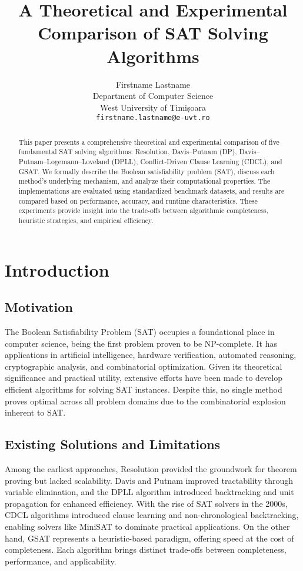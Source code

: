 \documentclass[11pt]{article}
\title{A Theoretical and Experimental Comparison of SAT Solving Algorithms}
\author{Firstname Lastname \\
Department of Computer Science \\
West University of Timișoara \\
\texttt{firstname.lastname@e-uvt.ro}}
\date{}
\begin{document}
\maketitle

\begin{abstract}
This paper presents a comprehensive theoretical and experimental comparison of five fundamental SAT solving algorithms: Resolution, Davis–Putnam (DP), Davis–Putnam–Logemann–Loveland (DPLL), Conflict-Driven Clause Learning (CDCL), and GSAT. We formally describe the Boolean satisfiability problem (SAT), discuss each method's underlying mechanism, and analyze their computational properties. The implementations are evaluated using standardized benchmark datasets, and results are compared based on performance, accuracy, and runtime characteristics. These experiments provide insight into the trade-offs between algorithmic completeness, heuristic strategies, and empirical efficiency.
\end{abstract}

\tableofcontents
\newpage

\section{Introduction}

\subsection*{Motivation}

The Boolean Satisfiability Problem (SAT) occupies a foundational place in computer science, being the first problem proven to be NP-complete. It has applications in artificial intelligence, hardware verification, automated reasoning, cryptographic analysis, and combinatorial optimization. Given its theoretical significance and practical utility, extensive efforts have been made to develop efficient algorithms for solving SAT instances. Despite this, no single method proves optimal across all problem domains due to the combinatorial explosion inherent to SAT.

\subsection*{Existing Solutions and Limitations}

Among the earliest approaches, Resolution provided the groundwork for theorem proving but lacked scalability. Davis and Putnam improved tractability through variable elimination, and the DPLL algorithm introduced backtracking and unit propagation for enhanced efficiency. With the rise of SAT solvers in the 2000s, CDCL algorithms introduced clause learning and non-chronological backtracking, enabling solvers like MiniSAT to dominate practical applications. On the other hand, GSAT represents a heuristic-based paradigm, offering speed at the cost of completeness. Each algorithm brings distinct trade-offs between completeness, performance, and applicability.
\end{document}
